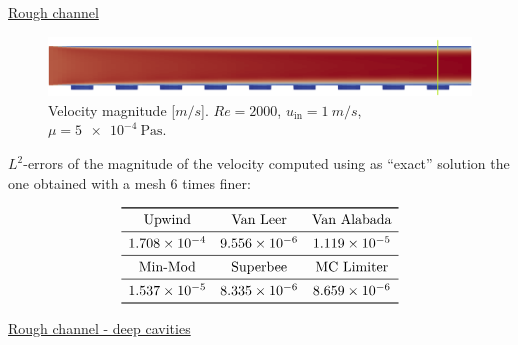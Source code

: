 \documentclass{beamer}
\begin{document}
\begin{frame}[label=rough]{\hyperlink{roughSupp}{Rough channel}}
\begin{figure}[t]
	\centering
	\includegraphics[width=\textwidth]{rough_channel_vl_barra.png}
	\caption{\tiny Velocity magnitude [$\si{m/s}$]. $Re=2000$, $u_\text{in} = 
	\SI{1}{m/s}$, $\mu=\SI{5e-4}{\pascal\second}$.}
\end{figure}
$L^2$-errors of the magnitude of the velocity computed using as ``exact'' 
solution the one obtained with a mesh 
6 times finer:
\begin{table}
	\footnotesize
	\centering
	\[
	\begin{array}{ccc}
	\toprule
	\text{Upwind} & \text{Van Leer} & \text{Van Alabada}\\
	\midrule
	\num{1.708e-4} & \num{9.556e-6} & \num{1.119e-5}\\
	\midrule
	\text{Min-Mod} & \text{Superbee} & \text{MC Limiter} \\ 
	\midrule
	\num{1.537e-5} & \num{8.335e-6} & \num{8.659e-6}\\
	\bottomrule
	\end{array}
	\]
\end{table}
\end{frame}
\begin{frame}{\hyperlink{roughSupp}{Rough channel - deep cavities}}
\begin{figure}
	\centering
	
\end{figure}
\end{frame}
\end{document}
